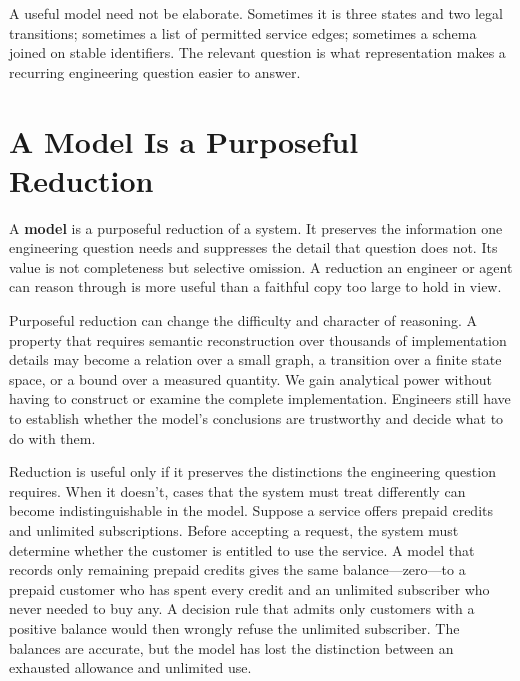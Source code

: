 A useful model need not be elaborate. Sometimes it is three states and two legal transitions; sometimes a list of permitted service edges; sometimes a schema joined on stable identifiers. The relevant question is what representation makes a recurring engineering question easier to answer.

\section{A Model Is a Purposeful Reduction}\label{heading:a-model-is-a-purposeful-reduction}




A \textbf{model} is a purposeful reduction of a system. It preserves the information one engineering question needs and suppresses the detail that question does not. Its value is not completeness but selective omission. A reduction an engineer or agent can reason through is more useful than a faithful copy too large to hold in view.

Purposeful reduction can change the difficulty and character of reasoning. A property that requires semantic reconstruction over thousands of implementation details may become a relation over a small graph, a transition over a finite state space, or a bound over a measured quantity. We gain analytical power without having to construct or examine the complete implementation. Engineers still have to establish whether the model’s conclusions are trustworthy and decide what to do with them.


Reduction is useful only if it preserves the distinctions the engineering question requires. When it doesn't, cases that the system must treat differently can become indistinguishable in the model. Suppose a service offers prepaid credits and unlimited subscriptions. Before accepting a request, the system must determine whether the customer is entitled to use the service. A model that records only remaining prepaid credits gives the same balance---zero---to a prepaid customer who has spent every credit and an unlimited subscriber who never needed to buy any. A decision rule that admits only customers with a positive balance would then wrongly refuse the unlimited subscriber. The balances are accurate, but the model has lost the distinction between an exhausted allowance and unlimited use.

